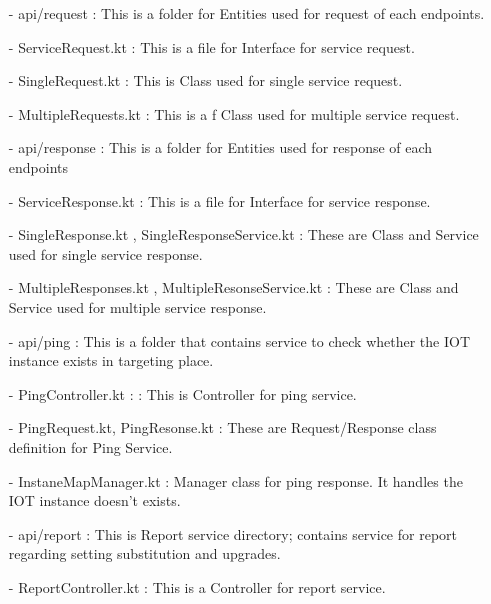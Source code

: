 \documentclass[conference]{IEEEtran}
\begin{document}
\begin{enumerate}
\\
        \item [-] api/request : This is a folder for Entities used for request of each endpoints.\\
        \item [-] ServiceRequest.kt : This is a file for Interface for service request.\\
        \item [-]SingleRequest.kt : This is Class used for single service request.\\
        \item[-] MultipleRequests.kt  : This is a f Class used for multiple service request.\\
        \item [-] api/response : This is a folder for Entities used for response of each endpoints\\
        \item [-] ServiceResponse.kt : This is a file for Interface for service response.\\
        \item [-] SingleResponse.kt , SingleResponseService.kt  : These are Class and Service used for single service
response.\\
        \item [-]MultipleResponses.kt , MultipleResonseService.kt  : These are Class and Service used for multiple service
response.\\
        \item[-] api/ping : This is a folder that contains service to check whether the IOT instance exists in targeting
place.\\
        \item [-] PingController.kt : : This is Controller for ping service.\\
        \item [-] PingRequest.kt, PingResonse.kt : These are Request/Response class definition for Ping Service.\\
        \item [-] InstaneMapManager.kt :  Manager class for ping response. It handles the IOT instance doesn't exists.\\
        \item [-] api/report : This is Report service directory; contains service for report regarding setting substitution and
upgrades. \\
        \item [-] ReportController.kt : This is a  Controller for report service.\\

\end{enumerate}
\end{document}
